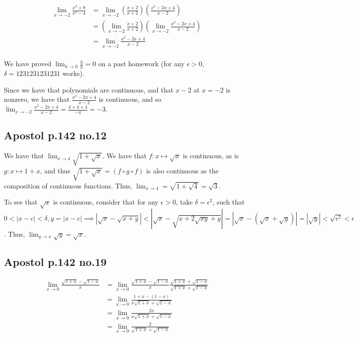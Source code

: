 \documentclass[12pt,letterpaper]{article}
\theoremstyle{definition}
\begin{document}
\begin{align*}
  \lim_{x\rightarrow -2} \frac{x^3 + 8}{x^2 - 4} &= \lim_{x\rightarrow -2} (\frac{x+2}{x+2})(\frac{x^2 - 2x + 4}{x-2}) \\
                                                 &= (\lim_{x\rightarrow -2}\frac{x+2}{x+2})(\lim_{x\rightarrow -2} \frac{x^2 -2x +4}{x-2}) \\
                                                 &= \lim_{x\rightarrow -2}\frac{x^2 -2x + 4}{x-2}\\
\end{align*}

We have proved $\lim_{h\rightarrow 0}\frac{h}{h} = 0$ on a past homework (for
any $\epsilon > 0$, $\delta = 1231231231231$ works).

Since we have that polynomials are continuous, and that $x-2$ at $x = -2$ is
nonzero, we have that $\frac{x^2 -2x + 4}{x-2}$ is continuous, and so
$\lim_{x\rightarrow -2}\frac{x^2 - 2x +4}{x-2} = \frac{4 + 4+ 4}{-4} = -3$.


\subsection*{Apostol p.142 no.12}

We have that $\lim_{x\rightarrow 4} \sqrt{1 + \sqrt{x}}$. We have that $f:x
\mapsto \sqrt{x}$ is continuous, as is $g:x \mapsto 1 + x$, and thus $\sqrt{1 +
  \sqrt{x}} = (f \circ g \circ f)$ is also continuous as the composition of
continuous functions. Thus, $\lim_{x\rightarrow
  4} = \sqrt{1 + \sqrt{4}} = \sqrt{3}$.

To see that $\sqrt{x}$ is continuous, consider that for any $\epsilon > 0$, take
$\delta = \epsilon^2 $, such that $0 < |x-c| < \delta, y = |x - c| \implies |\sqrt{x} -
\sqrt{x + y}| < |\sqrt{x} - \sqrt{x + 2\sqrt{xy} + y}| = |\sqrt{x} - (\sqrt{x} +
\sqrt{y})| = |\sqrt{y}| < \sqrt{\epsilon^2} < \epsilon$. Thus,
$\lim_{y\rightarrow x} \sqrt{y} = \sqrt{x}$.

\subsection*{Apostol p.142 no.19}

\begin{align*}
  \lim_{x\rightarrow 0} \frac{\sqrt{1+x} - \sqrt{1-x}}{x} &= \lim_{x\rightarrow 0} \frac{\sqrt{1+x} - \sqrt{1-x}}{x}\frac{\sqrt{1+x}+\sqrt{1-x}}{\sqrt{1+x}+\sqrt{1-x}} \\
                                                          &= \lim_{x\rightarrow 0} \frac{1+x - (1-x)}{x\sqrt{1+x}+\sqrt{1-x}} \\
                                                          &= \lim_{x\rightarrow 0} \frac{2x}{x\sqrt{1+x}+\sqrt{1-x}} \\
                                                          &= \lim_{x\rightarrow 0} \frac{2}{\sqrt{1+x}+\sqrt{1-x}} \\
\end{align*}
\end{document}

